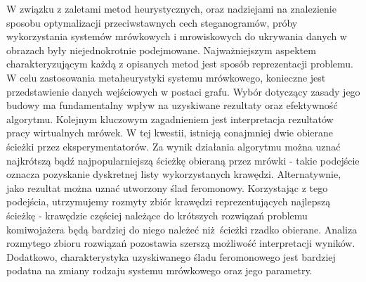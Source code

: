 {    %
    W związku z zaletami metod heurystycznych, oraz nadziejami na znalezienie sposobu optymalizacji przeciwstawnych cech
    steganogramów, próby wykorzystania systemów mrówkowych i mrowiskowych do ukrywania danych w obrazach były
    niejednokrotnie podejmowane\cite{Priya2018HIGHCA, ZghaerACOStegEN, Khan2018AntCO}.
    Najważniejszym aspektem charakteryzującym każdą z opisanych metod jest sposób reprezentacji problemu. W celu
    zastosowania metaheurystyki systemu mrówkowego, konieczne jest przedstawienie danych wejściowych w postaci grafu.
    Wybór dotyczący zasady jego budowy ma fundamentalny wpływ na uzyskiwane rezultaty oraz efektywność algorytmu.
    Kolejnym kluczowym zagadnieniem jest interpretacja rezultatów pracy wirtualnych mrówek. W tej kwestii, istnieją
    conajmniej dwie obierane ścieżki przez eksperymentatorów. Za wynik działania algorytmu można uznać najkrótszą bądź
    najpopularniejszą ścieżkę obieraną przez mrówki - takie podejście oznacza pozyskanie dyskretnej listy wykorzystanych
    krawędzi. Alternatywnie, jako rezultat można uznać utworzony ślad feromonowy. Korzystając z tego podejścia,
    utrzymujemy rozmyty zbiór krawędzi reprezentujących najlepszą ścieżkę - krawędzie częściej należące do krótszych
    rozwiązań problemu komiwojażera będą bardziej do niego należeć niż ścieżki rzadko obierane. Analiza rozmytego zbioru
    rozwiązań pozostawia szerszą możliwość interpretacji wyników. Dodatkowo, charakterystyka uzyskiwanego śladu
    feromonowego jest bardziej podatna na zmiany rodzaju systemu mrówkowego oraz jego parametry.

}
